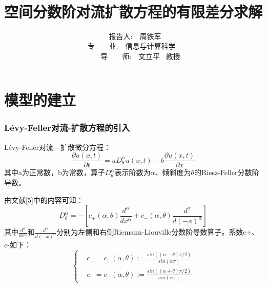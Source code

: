 \documentclass[notheorems,serif]{beamer}
\begin{document}
\title[湘潭大学本科生毕业答辩报告]{{\small{}~~~~~~~~~~~~~~~~~~~~~~~~~~~~~~~~~~~~~~~~~~~~~~
~~~~~~~~~~~} \\
空间分数阶对流扩散方程的有限差分求解
}




\author[周铁军]{~~~报告人:~~周铁军~~ \\
\vspace{0.2cm}
		\qquad\quad\qquad~专~~~~业:~~信息与计算科学~~\\
\vspace{0.2cm}
              \qquad ~~　导~~~~师:~~文立平 ~教授\\
                }

\institute[湘潭大学数学与计算科学学院]

\date[\today]




\frame[plain]{\titlepage}


\section{模型的建立}

\begin{frame}
\frametitle{Lévy-Feller对流-扩散方程的引入}
\qquad Lévy-Feller对流—扩散微分方程：
\begin{equation} 
\frac{\partial u(x, t)}{\partial t}=a D_{\theta}^{\alpha} u(x, t)-b \frac{\partial u(x, t)}{\partial x}
\end{equation}
其中a为正常数，b为常数，算子$D^{\alpha}_{\theta}$表示阶数为$\alpha$、倾斜度为$\theta$的Riesz-Feller分数阶导数。

由文献[5]中的内容可知：
$$D_{\theta}^{\alpha}=-\left[c_{+}(\alpha, \theta) \frac{d^{\alpha}}{d x^{\alpha}}+c_{-}(\alpha, \theta) \frac{d^{\alpha}}{d(-x)^{\alpha}}\right]$$
其中$\frac{d^{\alpha}}{dx^{\alpha}}$和$\frac{d^{\alpha}}{d(-x)^{\alpha}}$分别为左侧和右侧Riemann-Liouville分数阶导数算子。系数c+、c-如下：
\begin{equation*}
\left\{
\begin{aligned}
& c_{+} = c_{+}(\alpha,\theta) := \frac{sin((\alpha-\theta)\pi/2)}{sin(\alpha\pi)}
\\	& c_{-} = c_{-}(\alpha,\theta) := \frac{sin((\alpha+\theta)\pi/2)}{sin(\alpha\pi)}
\end{aligned}
\right.	
\end{equation*}
\end{frame}
\end{document}
